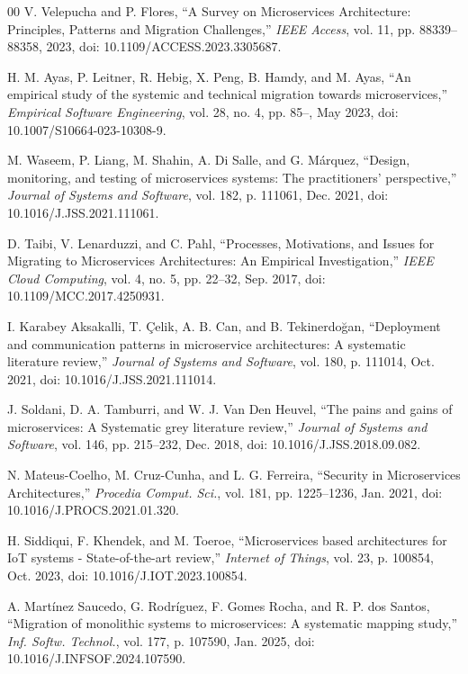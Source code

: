 \documentclass[10pt,conference]{IEEEtran}
\begin{document}
\begin{thebibliography}{00}
 V. Velepucha and P. Flores, ``A Survey on Microservices Architecture: Principles, Patterns and Migration Challenges,'' \textit{IEEE Access}, vol. 11, pp. 88339--88358, 2023, doi: 10.1109/ACCESS.2023.3305687.

 H. M. Ayas, P. Leitner, R. Hebig, X. Peng, B. Hamdy, and M. Ayas, ``An empirical study of the systemic and technical migration towards microservices,'' \textit{Empirical Software Engineering}, vol. 28, no. 4, pp. 85--, May 2023, doi: 10.1007/S10664-023-10308-9.

 M. Waseem, P. Liang, M. Shahin, A. Di Salle, and G. Márquez, ``Design, monitoring, and testing of microservices systems: The practitioners' perspective,'' \textit{Journal of Systems and Software}, vol. 182, p. 111061, Dec. 2021, doi: 10.1016/J.JSS.2021.111061.

 D. Taibi, V. Lenarduzzi, and C. Pahl, ``Processes, Motivations, and Issues for Migrating to Microservices Architectures: An Empirical Investigation,'' \textit{IEEE Cloud Computing}, vol. 4, no. 5, pp. 22--32, Sep. 2017, doi: 10.1109/MCC.2017.4250931.

 I. Karabey Aksakalli, T. Çelik, A. B. Can, and B. Tekinerdoğan, ``Deployment and communication patterns in microservice architectures: A systematic literature review,'' \textit{Journal of Systems and Software}, vol. 180, p. 111014, Oct. 2021, doi: 10.1016/J.JSS.2021.111014.

 J. Soldani, D. A. Tamburri, and W. J. Van Den Heuvel, ``The pains and gains of microservices: A Systematic grey literature review,'' \textit{Journal of Systems and Software}, vol. 146, pp. 215--232, Dec. 2018, doi: 10.1016/J.JSS.2018.09.082.

 N. Mateus-Coelho, M. Cruz-Cunha, and L. G. Ferreira, ``Security in Microservices Architectures,'' \textit{Procedia Comput. Sci.}, vol. 181, pp. 1225--1236, Jan. 2021, doi: 10.1016/J.PROCS.2021.01.320.

 H. Siddiqui, F. Khendek, and M. Toeroe, ``Microservices based architectures for IoT systems - State-of-the-art review,'' \textit{Internet of Things}, vol. 23, p. 100854, Oct. 2023, doi: 10.1016/J.IOT.2023.100854.

 A. Martínez Saucedo, G. Rodríguez, F. Gomes Rocha, and R. P. dos Santos, ``Migration of monolithic systems to microservices: A systematic mapping study,'' \textit{Inf. Softw. Technol.}, vol. 177, p. 107590, Jan. 2025, doi: 10.1016/J.INFSOF.2024.107590.


\end{thebibliography}
\end{document}

